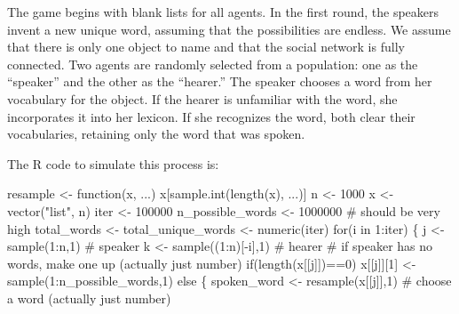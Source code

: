 \documentclass[
  a4paper,
  DIV=11,
  numbers=noendperiod]{scrreprt}
\newenvironment{Shaded}{\begin{snugshade}}{\end{snugshade}}
\newcommand{\CommentTok}[1]{\textcolor[rgb]{0.37,0.37,0.37}{#1}}
\newcommand{\ControlFlowTok}[1]{\textcolor[rgb]{0.00,0.23,0.31}{#1}}
\newcommand{\DecValTok}[1]{\textcolor[rgb]{0.68,0.00,0.00}{#1}}
\newcommand{\FunctionTok}[1]{\textcolor[rgb]{0.28,0.35,0.67}{#1}}
\newcommand{\NormalTok}[1]{\textcolor[rgb]{0.00,0.23,0.31}{#1}}
\newcommand{\OtherTok}[1]{\textcolor[rgb]{0.00,0.23,0.31}{#1}}
\newcommand{\SpecialCharTok}[1]{\textcolor[rgb]{0.37,0.37,0.37}{#1}}
\newcommand{\StringTok}[1]{\textcolor[rgb]{0.13,0.47,0.30}{#1}}
\begin{document}
The game begins with blank lists for all agents. In the first round, the
speakers invent a new unique word, assuming that the possibilities are
endless. We assume that there is only one object to name and that the
social network is fully connected. Two agents are randomly selected from
a population: one as the ``speaker'' and the other as the ``hearer.''
The speaker chooses a word from her vocabulary for the object. If the
hearer is unfamiliar with the word, she incorporates it into her
lexicon. If she recognizes the word, both clear their vocabularies,
retaining only the word that was spoken.

The R code to simulate this process is:

\begin{Shaded}
\begin{Highlighting}[]
\NormalTok{resample }\OtherTok{\textless{}{-}} \ControlFlowTok{function}\NormalTok{(x, ...) x[}\FunctionTok{sample.int}\NormalTok{(}\FunctionTok{length}\NormalTok{(x), ...)]}
\NormalTok{n }\OtherTok{\textless{}{-}} \DecValTok{1000}
\NormalTok{x }\OtherTok{\textless{}{-}} \FunctionTok{vector}\NormalTok{(}\StringTok{"list"}\NormalTok{, n)}
\NormalTok{iter }\OtherTok{\textless{}{-}} \DecValTok{100000}
\NormalTok{n\_possible\_words }\OtherTok{\textless{}{-}} \DecValTok{1000000} \CommentTok{\# should be very high}
\NormalTok{total\_words }\OtherTok{\textless{}{-}}\NormalTok{ total\_unique\_words  }\OtherTok{\textless{}{-}}  \FunctionTok{numeric}\NormalTok{(iter)}
\ControlFlowTok{for}\NormalTok{(i }\ControlFlowTok{in} \DecValTok{1}\SpecialCharTok{:}\NormalTok{iter)}
\NormalTok{\{}
\NormalTok{  j }\OtherTok{\textless{}{-}} \FunctionTok{sample}\NormalTok{(}\DecValTok{1}\SpecialCharTok{:}\NormalTok{n,}\DecValTok{1}\NormalTok{) }\CommentTok{\# speaker}
\NormalTok{  k }\OtherTok{\textless{}{-}} \FunctionTok{sample}\NormalTok{((}\DecValTok{1}\SpecialCharTok{:}\NormalTok{n)[}\SpecialCharTok{{-}}\NormalTok{i],}\DecValTok{1}\NormalTok{) }\CommentTok{\# hearer}
  \CommentTok{\# if speaker has no words, make one up (actually just number)}
  \ControlFlowTok{if}\NormalTok{(}\FunctionTok{length}\NormalTok{(x[[j]])}\SpecialCharTok{==}\DecValTok{0}\NormalTok{) x[[j]][}\DecValTok{1}\NormalTok{] }\OtherTok{\textless{}{-}} \FunctionTok{sample}\NormalTok{(}\DecValTok{1}\SpecialCharTok{:}\NormalTok{n\_possible\_words,}\DecValTok{1}\NormalTok{) }\ControlFlowTok{else} 
\NormalTok{  \{}
\NormalTok{    spoken\_word }\OtherTok{\textless{}{-}} \FunctionTok{resample}\NormalTok{(x[[j]],}\DecValTok{1}\NormalTok{) }\CommentTok{\# choose a word (actually just number)}

\end{Highlighting}
\end{Shaded}
\end{document}

